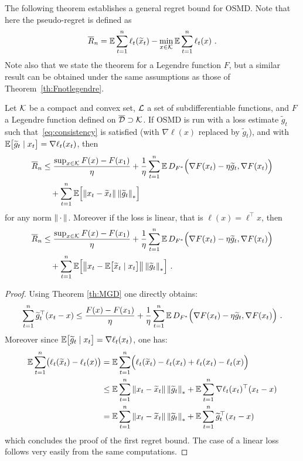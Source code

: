 The following theorem establishes a general regret bound for OSMD. Note that here the pseudo-regret is defined as
$$\overline{R}_n = \mathbb{E} \sum_{t=1}^n \ell_t(\widetilde{x}_t) - \min_{x \in \mathcal{K}} \mathbb{E} \sum_{t=1}^n \ell_t(x)~.$$
Note also that we state the theorem for a Legendre function $F$, but a similar result can be obtained under the same assumptions as those of Theorem~\ref{th:Fnotlegendre}.
%
\begin{theorem} \label{th:OSMD2}
Let $\mathcal{K}$ be a compact and convex set, $\mathcal{L}$ a set of subdifferentiable functions, and $F$ a Legendre function defined on $\overline{\mathcal{D}} \supset \mathcal{K}$. If OSMD is run with a loss estimate $\tilde{g}_t$ such that~\eqref{eq:consistency} is satisfied (with $\nabla \ell(x)$ replaced by $\tilde{g}_t$), and with $\mathbb{E}\bigl[\widetilde{g}_t \mid x_t\bigr] =\nabla \ell_t(x_t)$, then
\begin{align*}
\overline{R}_n & \leq \frac{\sup_{x \in \mathcal{K}} F(x) - F(x_1)}{\eta} + \frac{1}{\eta} \sum_{t=1}^n \mathbb{E}\, D_{F^*}\Bigl(\nabla F(x_t) - \eta \widetilde{g}_t, \nabla F(x_t)\Bigr) \\
&\quad + \sum_{t=1}^n \mathbb{E}\Bigl[\left\|{x_t - \widetilde{x}_t}\right\|  \left\|{\widetilde{g}_t}\right\|_*\Bigr]
\end{align*}
for any norm $\left\|{\,\cdot\,}\right\|$.
%
Moreover if the loss is linear, that is $\ell(x) = \ell^{\top} x$, then
\begin{align*}
\overline{R}_n & \leq \frac{\sup_{x \in \mathcal{K}} F(x) - F(x_1)}{\eta} + \frac{1}{\eta} \sum_{t=1}^n \mathbb{E}\, D_{F^*}\Bigl(\nabla F(x_t) - \eta \widetilde{g}_t, \nabla F(x_t)\Bigr) \\
&\quad + \sum_{t=1}^n \mathbb{E}\Bigl[\left\|{x_t - \mathbb{E}\bigl[\widetilde{x}_t \mid x_t\bigr]}\right\| \left\|{\widetilde{g}_t}\right\|_*\Bigr]~.
\end{align*}
\end{theorem}
%
\begin{proof}
Using Theorem \ref{th:MGD} one directly obtains:
$$\sum_{t=1}^n \widetilde{g}_t^{\top} (x_t - x) \leq \frac{F(x) - F(x_1)}{\eta} + \frac{1}{\eta} \sum_{t=1}^n \mathbb{E}\, D_{F^*} \Bigl(\nabla F(x_t) - \eta \widetilde{g}_t, \nabla F(x_t)\Bigr)~.$$
Moreover since $\mathbb{E}\bigl[\widetilde{g}_t \mid x_t\bigr] =\nabla \ell_t(x_t)$, one has:
\begin{align*}
\mathbb{E} \sum_{t=1}^n \bigl( \ell_t(\widetilde{x}_t) - \ell_t(x) \bigr) & = \mathbb{E} \sum_{t=1}^n \Bigl( \ell_t(\widetilde{x}_t) - \ell_t(x_t) + \ell_t(x_t) - \ell_t(x) \Bigr) \\
& \leq \mathbb{E} \sum_{t=1}^n \left\|{x_t - \widetilde{x}_t}\right\| \left\|{\widetilde{g}_t}\right\|_* + \mathbb{E} \sum_{t=1}^n \nabla \ell_t(x_t)^{\top} (x_t - x) \\
& = \mathbb{E} \sum_{t=1}^n \left\|{x_t - \widetilde{x}_t}\right\| \left\|{\widetilde{g}_t}\right\|_* + \mathbb{E} \sum_{t=1}^n \widetilde{g}_t^{\top} (x_t - x)
\end{align*}
which concludes the proof of the first regret bound. The case of a linear loss follows very easily from the same computations.
\end{proof}

